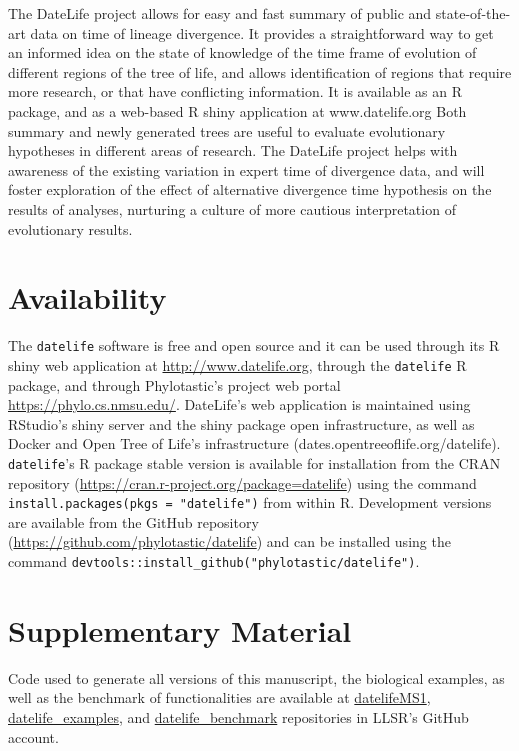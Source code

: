 \documentclass[
  man]{apa6}
\begin{document}
The DateLife project allows for easy and fast summary of public and state-of-the-art data on time of lineage divergence.
It provides a straightforward way to get an informed idea on the state of knowledge of the time frame of evolution of different regions of the tree of life, and allows identification of regions that require more research, or that have conflicting information.
It is available as an R package, and as a web-based R shiny application at www.datelife.org
Both summary and newly generated trees are useful to evaluate evolutionary hypotheses in different areas of research. The DateLife project helps with awareness of the existing variation in expert time of divergence data, and will foster exploration of the effect of alternative divergence time hypothesis on the results of analyses, nurturing a culture of more cautious interpretation of evolutionary results.

\hypertarget{availability}{%
\section{Availability}\label{availability}}

The \texttt{datelife} software is free and open source and it can be used through its R shiny web application at
\url{http://www.datelife.org}, through the \texttt{datelife} R package, and through Phylotastic's project web portal \url{https://phylo.cs.nmsu.edu/}.
DateLife's web application is maintained using RStudio's shiny server and the shiny package open infrastructure, as well as Docker and Open Tree of Life's infrastructure (dates.opentreeoflife.org/datelife).
\texttt{datelife}'s R package stable version is available
for installation from the CRAN repository (\url{https://cran.r-project.org/package=datelife})
using the command \texttt{install.packages(pkgs\ =\ "datelife")} from within R. Development versions
are available from the GitHub repository (\url{https://github.com/phylotastic/datelife})
and can be installed using the command \texttt{devtools::install\_github("phylotastic/datelife")}.

\hypertarget{supplementary-material}{%
\section{Supplementary Material}\label{supplementary-material}}

Code used to generate all versions of this manuscript, the biological examples, as well as the benchmark of functionalities are available at \href{https://github.com/LunaSare/datelifeMS1}{datelifeMS1}, \href{https://github.com/LunaSare/datelife_examples}{datelife\_examples}, and \href{https://github.com/LunaSare/datelife_benchmark}{datelife\_benchmark} repositories in LLSR's GitHub account.
\end{document}
